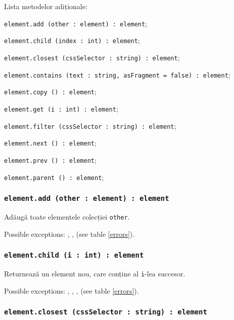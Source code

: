 Lista metodelor adiționale:
\begin{icItems}
	\item \texttt{element.add (other : element) : element};
	\item \texttt{element.child (index : int) : element};
	\item \texttt{element.closest (cssSelector : string) : element};
	\item \texttt{element.contains (text : string, asFragment = false) : element};
	\item \texttt{element.copy () : element};
	\item \texttt{element.get (i : int) : element};
	\item \texttt{element.filter (cssSelector : string) : element};
	\item \texttt{element.next () : element};
	\item \texttt{element.prev () : element};
	\item \texttt{element.parent () : element};
\end{icItems}

\subsubsection{\texttt{element.add (other : element) : element}}

Adăugă toate elementele colecției \texttt{other}.

Possible exceptions: , ,  (see table \ref{errors}).

\subsubsection{\texttt{element.child (i : int) : element}}

Returnează un element nou, care conține al \texttt{i}-lea succesor.

Possible exceptions: , , ,  (see table \ref{errors}).

\subsubsection{\texttt{element.closest (cssSelector : string) : element}}

